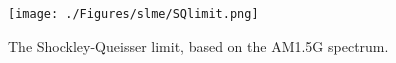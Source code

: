 \begin{refsection}
\begin{figure}[!htp] 
\centering
\texttt{[image: ./Figures/slme/SQlimit.png]}
\caption{\label{fig:slme-SQlimit} The Shockley-Queisser limit, based on the AM1.5G spectrum.}
\end{figure}

%
%


\end{refsection}
